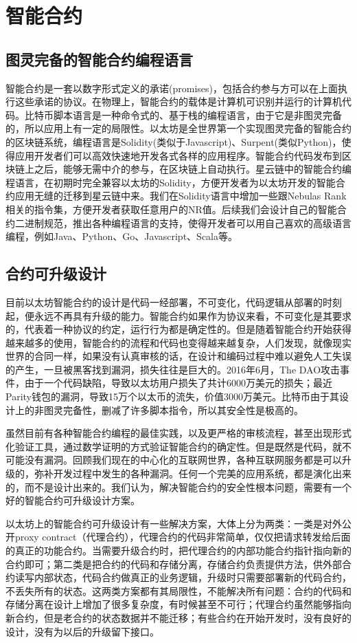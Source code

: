 \section{智能合约}

\subsection{图灵完备的智能合约编程语言}
智能合约是一套以数字形式定义的承诺(promises)，包括合约参与方可以在上面执行这些承诺的协议。在物理上，智能合约的载体是计算机可识别并运行的计算机代码。比特币脚本语言是一种命令式的、基于栈的编程语言，由于它是非图灵完备的，所以应用上有一定的局限性。以太坊是全世界第一个实现图灵完备的智能合约的区块链系统，编程语言是Solidity(类似于Javascript)、Surpent(类似Python)，使得应用开发者们可以高效快速地开发各式各样的应用程序。智能合约代码发布到区块链上之后，能够无需中介的参与，在区块链上自动执行。星云链中的智能合约编程语言，在初期时完全兼容以太坊的Solidity，方便开发者为以太坊开发的智能合约应用无缝的迁移到星云链中来。我们在Solidity语言中增加一些跟Nebulas Rank相关的指令集，方便开发者获取任意用户的NR值。后续我们会设计自己的智能合约二进制规范，推出各种编程语言的支持，使得开发者可以用自己喜欢的高级语言编程，例如Java、Python、Go、Javascript、Scala等。

\subsection{合约可升级设计}
目前以太坊智能合约的设计是代码一经部署，不可变化，代码逻辑从部署的时刻起，便永远不再具有升级的能力。智能合约如果作为协议来看，不可变化是其要求的，代表着一种协议的约定，运行行为都是确定性的。但是随着智能合约开始获得越来越多的使用，智能合约的流程和代码也变得越来越复杂，人们发现，就像现实世界的合同一样，如果没有认真审核的话，在设计和编码过程中难以避免人工失误的产生，一旦被黑客找到漏洞，损失往往是巨大的。2016年6月，The DAO攻击事件，由于一个代码缺陷，导致以太坊用户损失了共计6000万美元的损失；最近Parity钱包的漏洞，导致15万个以太币的流失，价值3000万美元。比特币由于其设计上的非图灵完备性，删减了许多脚本指令，所以其安全性是极高的。

虽然目前有各种智能合约编程的最佳实践，以及更严格的审核流程，甚至出现形式化验证工具，通过数学证明的方式验证智能合约的确定性。但是既然是代码，就不可能没有漏洞。回顾我们现在的中心化的互联网世界，各种互联网服务都是可以升级的，弥补开发过程中发生的各种漏洞。任何一个完美的应用系统，都是演化出来的，而不是设计出来的。我们认为，解决智能合约的安全性根本问题，需要有一个好的智能合约可升级设计方案。

以太坊上的智能合约可升级设计有一些解决方案，大体上分为两类：一类是对外公开proxy contract（代理合约），代理合约的代码非常简单，仅仅把请求转发给后面的真正的功能合约。当需要升级合约时，把代理合约的内部功能合约指针指向新的合约即可；第二类是把合约的代码和存储分离，存储合约负责提供方法，供外部合约读写内部状态，代码合约做真正的业务逻辑，升级时只需要部署新的代码合约，不丢失所有的状态。这两类方案都有其局限性，不能解决所有问题：合约的代码和存储分离在设计上增加了很多复杂度，有时候甚至不可行；代理合约虽然能够指向新合约，但是老合约的状态数据并不能迁移；有些合约在开始开发时，没有良好的设计，没有为以后的升级留下接口。

